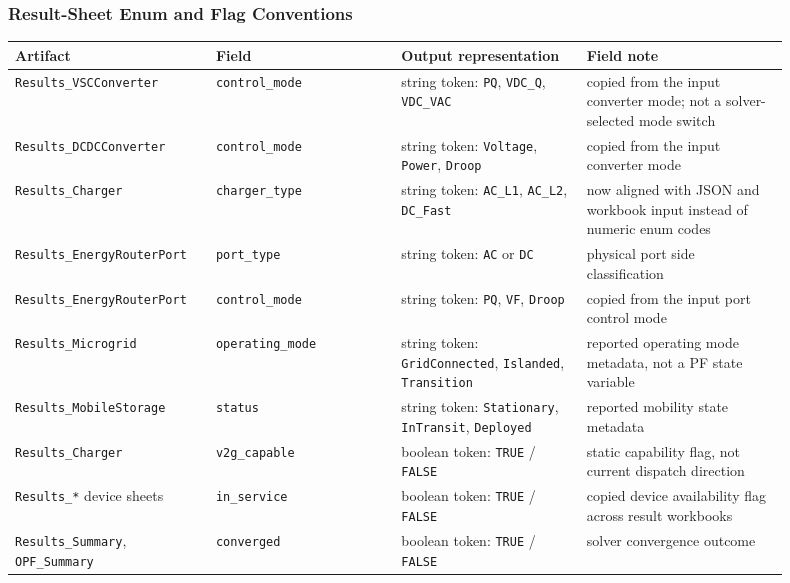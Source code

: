 \subsubsection*{Result-Sheet Enum and Flag Conventions}

\begin{longtable}{L{0.22\linewidth}L{0.22\linewidth}L{0.22\linewidth}L{0.24\linewidth}}
\toprule
Artifact & Field & Output representation & Field note \\
\midrule
\endhead
\texttt{Results\_VSCConverter} & \texttt{control\_mode} & string token: \texttt{PQ}, \texttt{VDC\_Q}, \texttt{VDC\_VAC} & copied from the input converter mode; not a solver-selected mode switch \\
\texttt{Results\_DCDCConverter} & \texttt{control\_mode} & string token: \texttt{Voltage}, \texttt{Power}, \texttt{Droop} & copied from the input converter mode \\
\texttt{Results\_Charger} & \texttt{charger\_type} & string token: \texttt{AC\_L1}, \texttt{AC\_L2}, \texttt{DC\_Fast} & now aligned with JSON and workbook input instead of numeric enum codes \\
\texttt{Results\_EnergyRouterPort} & \texttt{port\_type} & string token: \texttt{AC} or \texttt{DC} & physical port side classification \\
\texttt{Results\_EnergyRouterPort} & \texttt{control\_mode} & string token: \texttt{PQ}, \texttt{VF}, \texttt{Droop} & copied from the input port control mode \\
\texttt{Results\_Microgrid} & \texttt{operating\_mode} & string token: \texttt{GridConnected}, \texttt{Islanded}, \texttt{Transition} & reported operating mode metadata, not a PF state variable \\
\texttt{Results\_MobileStorage} & \texttt{status} & string token: \texttt{Stationary}, \texttt{InTransit}, \texttt{Deployed} & reported mobility state metadata \\
\texttt{Results\_Charger} & \texttt{v2g\_capable} & boolean token: \texttt{TRUE} / \texttt{FALSE} & static capability flag, not current dispatch direction \\
\texttt{Results\_*} device sheets & \texttt{in\_service} & boolean token: \texttt{TRUE} / \texttt{FALSE} & copied device availability flag across result workbooks \\
\texttt{Results\_Summary}, \texttt{OPF\_Summary} & \texttt{converged} & boolean token: \texttt{TRUE} / \texttt{FALSE} & solver convergence outcome \\
\bottomrule
\end{longtable}

